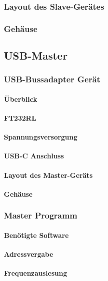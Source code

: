 \subsubsection{Layout des Slave-Gerätes}
\subsubsection{Gehäuse}


\subsection{USB-Master}
\subsubsection{USB-Bussadapter Gerät}
\paragraph{Überblick}
\paragraph{FT232RL}
\paragraph{Spannungsversorgung}
\paragraph{USB-C Anschluss}
\paragraph{Layout des Master-Geräts}
\paragraph{Gehäuse}

\subsubsection{Master Programm}
\paragraph{Benötigte Software}
\paragraph{Adressvergabe}
\paragraph{Frequenzauslesung}

